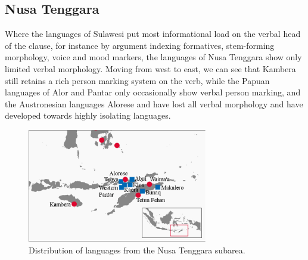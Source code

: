 \begin{table}
\caption[Basic verbal features of the Sulawesi languages]{Overview of basic verbal features of the Sulawesi languages in the data set. Constituent order lists only the basic pattern, pragmatically induced alternative patterns are often also available.}
\label{table:overviewsulawesi}
\end{table}

\subsection{Nusa Tenggara} \label{sec:nus}

Where the languages of Sulawesi put most informational load on the verbal head of the clause, for instance by argument indexing formatives, stem-forming morphology, voice and mood markers, the languages of Nusa Tenggara show only limited verbal morphology. Moving from west to east, we can see that Kambera still retains a rich person marking system on the verb, while the Papuan languages of Alor and Pantar only occasionally show verbal person marking, and the Austronesian languages Alorese and  have lost all verbal morphology and have developed towards highly isolating languages.

\begin{figure}

\includegraphics[width=0.7\textwidth]{figures/Map_Nusa2.eps}
\caption{Distribution of languages from the Nusa Tenggara subarea.}\label{map:Nus}

\end{figure}  

